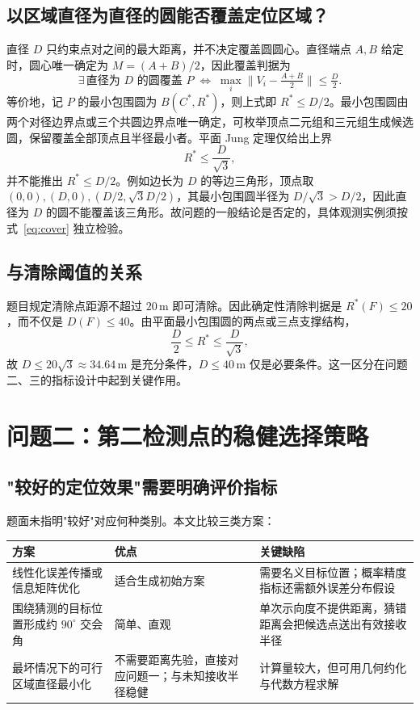 \documentclass[12pt,a4paper]{ctexart}
\begin{document}
\subsection{以区域直径为直径的圆能否覆盖定位区域？}
\label{sec:q1-cover}
直径 $D$ 只约束点对之间的最大距离，并不决定覆盖圆圆心。直径端点 $A,B$ 给定时，圆心唯一确定为 $M=(A+B)/2$，因此覆盖判据为
\begin{equation}
 \boxed{\;\exists\,\text{直径为 }D\text{ 的圆覆盖 }P
 \;\Longleftrightarrow\;
 \max_i\bigl\|V_i-\tfrac{A+B}{2}\bigr\|\le\tfrac{D}{2}.\;}
 \label{eq:cover}
\end{equation}
等价地，记 $P$ 的最小包围圆为 $B(C^*,R^*)$，则上式即 $R^*\le D/2$。最小包围圆由两个对径边界点或三个共圆边界点唯一确定，可枚举顶点二元组和三元组生成候选圆，保留覆盖全部顶点且半径最小者。平面 Jung 定理仅给出上界
\begin{equation}
 R^*\le\frac{D}{\sqrt{3}},
\end{equation}
并不能推出 $R^*\le D/2$。例如边长为 $D$ 的等边三角形，顶点取 $(0,0),(D,0),(D/2,\sqrt3 D/2)$，其最小包围圆半径为 $D/\sqrt3>D/2$，因此直径为 $D$ 的圆不能覆盖该三角形。故问题的一般结论是否定的，具体观测实例须按式~\eqref{eq:cover} 独立检验。

\subsection{与清除阈值的关系}
题目规定清除点距源不超过 $20\,\mathrm{m}$ 即可清除。因此确定性清除判据是 $R^*(F)\le 20$，而不仅是 $D(F)\le 40$。由平面最小包围圆的两点或三点支撑结构，
\[
 \frac{D}{2}\le R^*\le\frac{D}{\sqrt3},
\]
故 $D\le 20\sqrt3\approx 34.64\,\mathrm{m}$ 是充分条件，$D\le 40\,\mathrm{m}$ 仅是必要条件。这一区分在问题二、三的指标设计中起到关键作用。

\section{问题二：第二检测点的稳健选择策略}

\subsection{"较好的定位效果"需要明确评价指标}
\label{sec:q2-metric}
题面未指明"较好"对应何种类别。本文比较三类方案：
\begin{table}[H]
\centering
\begin{tabularx}{\textwidth}{X X X}
\toprule
方案 & 优点 & 关键缺陷 \\
\midrule
线性化误差传播或信息矩阵优化 & 适合生成初始方案 & 需要名义目标位置；概率精度指标还需额外误差分布假设 \\
围绕猜测的目标位置形成约 $90^\circ$ 交会角 & 简单、直观 & 单次示向度不提供距离，猜错距离会把候选点送出有效接收半径 \\
最坏情况下的可行区域直径最小化 & 不需要距离先验，直接对应问题一；与未知接收半径稳健 & 计算量较大，但可用几何约化与代数方程求解 \\
\bottomrule
\end{tabularx}
\end{table}
\end{document}
